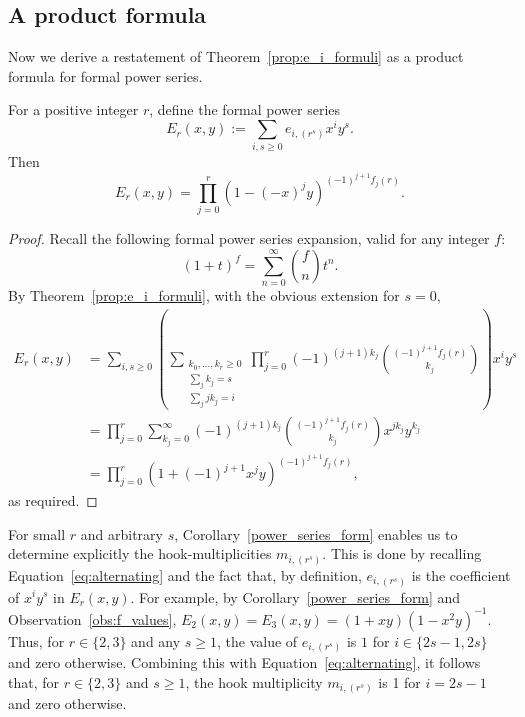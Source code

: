 \documentclass[ALCO,published]{cedram}
\begin{document}
	
\subsection{A product formula}
\label{sec:prod}
	
Now we derive a restatement of Theorem~\ref{prop:e_i_formuli} as a product formula for formal power series. 

\begin{corollary}\label{power_series_form}
    For a positive integer $r$, define the formal power series
    \[
        E_r(x,y) := \sum_{i,s \ge 0} e_{i,(r^s)} x^i y^s.
    \]
    Then
    \[
        E_r(x,y) 
        = \prod_{j=0}^{r} (1 - (-x)^j y)^{(-1)^{j+1}f_j(r)}.
    \]
\end{corollary}
	
\begin{proof}
    Recall the following formal power series expansion, valid for any integer $f$:
    \[
        (1+t)^{f} = \sum_{n=0}^\infty \binom{f}{n} t^n.
    \]
    By Theorem~\ref{prop:e_i_formuli},
    with the obvious extension for $s=0$,
    \begin{align*}
        E_r(x,y) 
        &= \sum_{i,s \ge 0} \left(
        \sum_{\substack{k_0,\ldots,k_r \ge 0 \\ \sum_j k_j=s \\ \sum_j jk_j = i}} 
        \prod_{j = 0}^{r}
        (-1)^{(j+1)k_j} \binom{(-1)^{j+1} f_j(r)}{k_j}
        \right) x^i y^s \\
        &= \prod_{j=0}^{r} \sum_{k_j=0}^\infty
        (-1)^{(j+1)k_j} \binom{(-1)^{j+1} f_j(r)}{k_j}
        x^{jk_j} y^{k_j} \\
        &= \prod_{j=0}^{r} (1 + (-1)^{j+1} x^j y)^{(-1)^{j+1}f_j(r)},
    \end{align*}
    as required.
\end{proof}
	
\begin{remark}\label{rem:le_3}
    For small $r$ and arbitrary $s$, Corollary~\ref{power_series_form}  enables us to determine explicitly the hook-multiplicities $m_{i,(r^s)}$. 
    This is done by recalling Equation~\eqref{eq:alternating} and the fact that, by definition, $e_{i,(r^s)}$ is the coefficient of $x^i y^s$ in $E_r(x,y)$. 
    For example, by Corollary~\ref{power_series_form} and Observation~\ref{obs:f_values}, 
    $E_2(x,y) = E_3(x,y) = (1+xy)(1-x^2y)^{-1}$. 
    Thus, for $r \in \{2,3\}$ and any $s \ge 1$, the value of $e_{i,(r^s)}$ is $1$ for $i \in \{2s-1,2s\}$ and zero otherwise. 
    Combining this with Equation~\eqref{eq:alternating}, 
    it follows that, for $r \in \{2,3\}$ and $s \ge 1$, the hook multiplicity $m_{i,(r^s)}$ 
    is 1 for $i = 2s-1$ and zero otherwise. 
\end{remark}	
\end{document}

